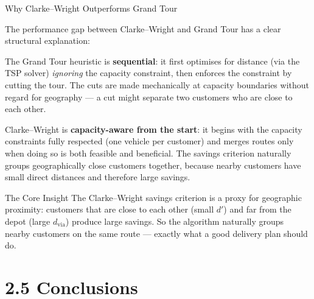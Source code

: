 \documentclass[aspectratio=169,10pt]{beamer}
\begin{document}
\begin{frame}[allowframebreaks]{Why Clarke--Wright Outperforms Grand Tour}

  The performance gap between Clarke--Wright and Grand Tour has a clear
  structural explanation:

  \bigskip
  The Grand Tour heuristic is \textbf{sequential}: it first optimises for
  distance (via the TSP solver) \emph{ignoring} the capacity constraint, then
  enforces the constraint by cutting the tour.  The cuts are made mechanically
  at capacity boundaries without regard for geography --- a cut might separate
  two customers who are close to each other.

  \bigskip
  Clarke--Wright is \textbf{capacity-aware from the start}: it begins with
  the capacity constraints fully respected (one vehicle per customer) and
  merges routes only when doing so is both feasible and beneficial.  The
  savings criterion naturally groups geographically close customers together,
  because nearby customers have small direct distances and therefore large
  savings.

  \begin{alertblock}{The Core Insight}
    The Clarke--Wright savings criterion is a proxy for geographic proximity:
    customers that are close to each other (small $d'$) and far from the depot
    (large $d_{\text{via}}$) produce large savings.  So the algorithm
    naturally groups nearby customers on the same route --- exactly what a
    good delivery plan should do.
  \end{alertblock}

\end{frame}

\section{2.5 Conclusions}
\end{document}
